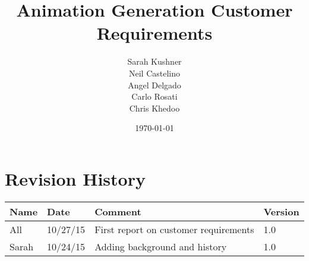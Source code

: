 \documentclass{report}
\begin{document}
\title{Animation Generation Customer Requirements}
\author{Sarah Kushner \\
		Neil Castelino \\
		Angel Delgado \\
		Carlo Rosati \\
		Chris Khedoo}
\date{\today}
\maketitle
\small

\pagebreak
\section{Revision History}
\begin{tabular}{|l|l|l|l|}
\hline
Name	& Date	 		& 	Comment	 								& 	Version	 \\ \hline
All		& 10/27/15		& 	First report on customer requirements	&  	1.0 	 \\ \hline
Sarah		& 10/24/15		& 	Adding background and history	&  	1.0 	 \\ \hline
\end{tabular}

\pagebreak




\end{document}
